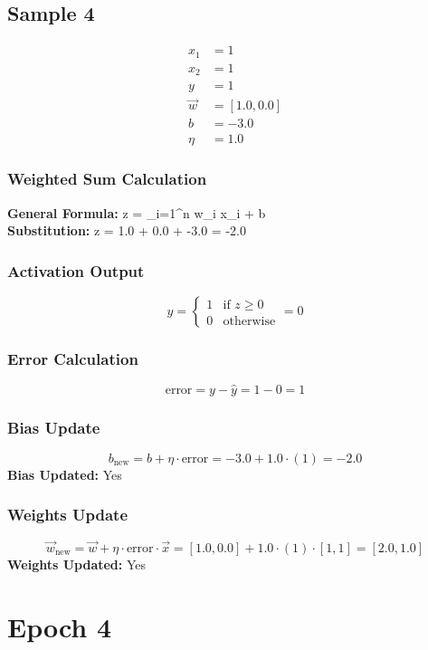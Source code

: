 \documentclass{article}
\begin{document}
\subsection*{Sample 4}
\begin{align*}
x_1 &= 1 \\
x_2 &= 1 \\
y &= 1 \\
\vec{w} &= [1.0, 0.0] \\
b &= -3.0 \\
\eta &= 1.0
\end{align*}

\subsubsection*{Weighted Sum Calculation}
\textbf{General Formula:} \quad
z = \sum_{i=1}^{n} w_i x_i + b
\\
\textbf{Substitution:} \quad
z = 1.0  + 0.0  + -3.0 = -2.0

\subsubsection*{Activation Output}
\[
\hat{y} =
\begin{cases}
1 & \text{if } z \geq 0 \\
0 & \text{otherwise}
\end{cases}
= 0
\]

\subsubsection*{Error Calculation}
\[
\text{error} = y - \hat{y} = 1 - 0 = 1
\]

\subsubsection*{Bias Update}
\[
b_{\text{new}} = b + \eta \cdot \text{error} = -3.0 + 1.0 \cdot (1) = -2.0
\]
\textbf{Bias Updated:} Yes

\subsubsection*{Weights Update}
\[
\vec{w}_{\text{new}} = \vec{w} + \eta \cdot \text{error} \cdot \vec{x} = 
[1.0, 0.0] + 1.0 \cdot (1) \cdot [1, 1] = 
[2.0, 1.0]
\]
\textbf{Weights Updated:} Yes

\section*{Epoch 4}
\end{document}
